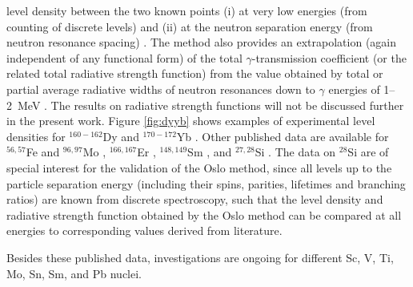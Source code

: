 \documentclass[sort&compress,final,numberedheadings]{aipproc}
\begin{document}
level density between the two known points (i) at very low energies (from 
counting of discrete levels) and (ii) at the neutron separation energy (from 
neutron resonance spacing) \cite{MG01,SG02,GM03,SA03,GB03,AS04}. The method 
also provides an extrapolation (again independent of any functional form) of 
the total $\gamma$-transmission coefficient (or the related total radiative 
strength function) from the value obtained by total or partial average 
radiative widths of neutron resonances down to $\gamma$ energies of 1--2~MeV 
\cite{MG01,SG02,GM03,GB03,AS04,VG01,VA04}. The results on radiative strength 
functions will not be discussed further in the present work. Figure 
\ref{fig:dyyb} shows examples of experimental level densities for 
$^{160-162}$Dy \cite{GB03} and $^{170-172}$Yb \cite{AS04}. Other published data
are available for $^{56,57}$Fe and $^{96,97}$Mo \cite{SA03}, $^{166,167}$Er 
\cite{MG01}, $^{148,149}$Sm \cite{SG02}, and $^{27,28}$Si \cite{GM03}. The data
on $^{28}$Si are of special interest for the validation of the Oslo method, 
since all levels up to the particle separation energy (including their spins, 
parities, lifetimes and branching ratios) are known from discrete spectroscopy,
such that the level density and radiative strength function obtained by the 
Oslo method can be compared at all energies to corresponding values derived 
from literature. 

Besides these published data, investigations are ongoing for different Sc, V, 
Ti, Mo, Sn, Sm, and Pb nuclei.
\end{document}
